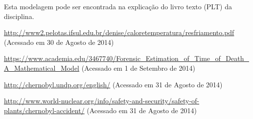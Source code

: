 \documentclass[a4paper]{article}
\begin{document}


\begin{thebibliography}{9}

 Esta modelagem pode ser encontrada na explicação do
  livro texto (PLT) da disciplina.

  \url{http://www2.pelotas.ifsul.edu.br/denise/caloretemperatura/resfriamento.pdf}
  (Acessado em 30 de Agosto de 2014)

  \url{https://www.academia.edu/3467740/Forensic_Estimation_of_Time_of_Death_A_Mathematical_Model}
(Acessado em 1 de Setembro de 2014)

 \url{http://chernobyl.undp.org/english/}
  (Acessado em 31 de Agosto de 2014)

  \url{http://www.world-nuclear.org/info/safety-and-security/safety-of-plants/chernobyl-accident/}
  (Acessado em 31 de Agosto de 2014)

\end{thebibliography}
\end{document}
